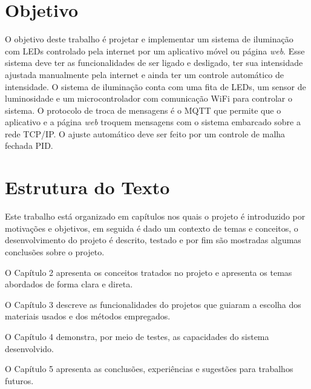 \section{Objetivo}

O objetivo deste trabalho é projetar e implementar um sistema de iluminação com LEDs controlado pela internet por um aplicativo móvel ou página \textit{web}. Esse sistema deve ter as funcionalidades de ser ligado e desligado, ter sua intensidade ajustada manualmente pela internet e ainda ter um controle automático de intensidade. O sistema de iluminação conta com uma fita de LEDs, um sensor de luminosidade e um microcontrolador com comunicação WiFi para controlar o sistema. O protocolo de troca de mensagens é o MQTT que permite que o aplicativo e a página \textit{web} troquem mensagens com o sistema embarcado sobre a rede TCP/IP. O ajuste automático deve ser feito por um controle de malha fechada PID.

\section{Estrutura do Texto}

Este trabalho está organizado em capítulos nos quais o projeto é introduzido por motivações e objetivos, em seguida é dado um contexto de temas e conceitos, o desenvolvimento do projeto é descrito, testado e por fim são mostradas algumas conclusões sobre o projeto.

O Capítulo 2 apresenta os conceitos tratados no projeto e apresenta os temas abordados de forma clara e direta.

O Capítulo 3 descreve as funcionalidades do projetos que guiaram a escolha dos materiais usados e dos métodos empregados.

O Capítulo 4 demonstra, por meio de testes, as capacidades do sistema desenvolvido.

O Capítulo 5 apresenta as conclusões, experiências e sugestões para trabalhos futuros.